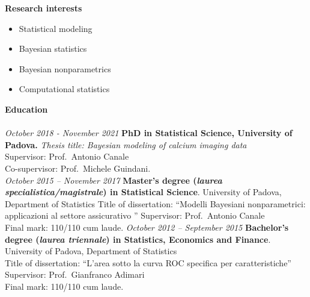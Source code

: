 \documentclass[10pt]{amsart}
\begin{document}
	{\large {\bf Research interests}} \\[-.08cm] 
	\underline{\hspace{6in}} 
	\begin{itemize}
	\item 	Statistical modeling
	\item 	Bayesian statistics
	\item	Bayesian nonparametrics
	\item 	Computational statistics
	\end{itemize}
		\vspace{2ex}
	{\large {\bf Education}} \\[-.08cm] 
	\underline{\hspace{6in}} \\[.2cm] 
	{\it October 2018 - November 2021}\newline
	{\bf PhD in Statistical Science,  University of Padova. 
	} 
	\newline 
	{\it Thesis title: Bayesian modeling of calcium imaging data }\\
	Supervisor: Prof.\ Antonio Canale\\
	Co-supervisor: Prof.\ Michele Guindani.	\\ \newline
		{\it October 2015 -- November 2017 } \newline
	{\bf Master's degree ({\it laurea specialistica/magistrale}) in Statistical Science}.\newline
	University of Padova, Department of Statistics \newline
	Title of dissertation: ``Modelli Bayesiani nonparametrici: applicazioni al settore assicurativo   '' \newline
	 	Supervisor: Prof.\ Antonio Canale\\
	Final mark: 110/110 cum laude.
	\newline\newline
	 	{\it October 2012 -- September 2015} \newline
	{\bf Bachelor's degree ({\it laurea triennale}) in Statistics, Economics and Finance}. \newline
	University of Padova, Department of Statistics \\
	Title of dissertation: ``L’area sotto la curva ROC specifica per caratteristiche'' \newline
	Supervisor: Prof.\  Gianfranco Adimari\\
	Final mark:  110/110 cum laude.
	\newline\newline
	  
\end{document}
